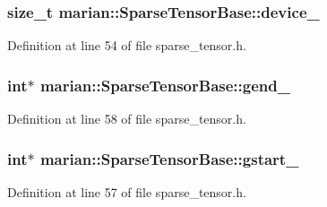 \subsubsection[{\texorpdfstring{device\+\_\+}{device_}}]{\setlength{\rightskip}{0pt plus 5cm}size\+\_\+t marian\+::\+Sparse\+Tensor\+Base\+::device\+\_\+\hspace{0.3cm}{\ttfamily [private]}}\hypertarget{classmarian_1_1SparseTensorBase_a56fcd8295b57ec3eb731cd431f80c110}{}\label{classmarian_1_1SparseTensorBase_a56fcd8295b57ec3eb731cd431f80c110}


Definition at line 54 of file sparse\+\_\+tensor.\+h.

\subsubsection[{\texorpdfstring{gend\+\_\+}{gend_}}]{\setlength{\rightskip}{0pt plus 5cm}int$\ast$ marian\+::\+Sparse\+Tensor\+Base\+::gend\+\_\+\hspace{0.3cm}{\ttfamily [private]}}\hypertarget{classmarian_1_1SparseTensorBase_a226a045c5a1148e945a177bd283c693b}{}\label{classmarian_1_1SparseTensorBase_a226a045c5a1148e945a177bd283c693b}


Definition at line 58 of file sparse\+\_\+tensor.\+h.

\subsubsection[{\texorpdfstring{gstart\+\_\+}{gstart_}}]{\setlength{\rightskip}{0pt plus 5cm}int$\ast$ marian\+::\+Sparse\+Tensor\+Base\+::gstart\+\_\+\hspace{0.3cm}{\ttfamily [private]}}\hypertarget{classmarian_1_1SparseTensorBase_ab8941274a48c9bf0f53785888e97e9d9}{}\label{classmarian_1_1SparseTensorBase_ab8941274a48c9bf0f53785888e97e9d9}


Definition at line 57 of file sparse\+\_\+tensor.\+h.

